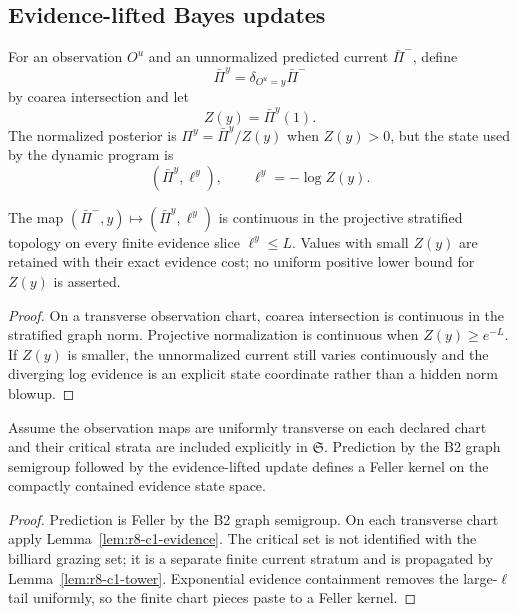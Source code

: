 \subsection{Evidence-lifted Bayes updates}

For an observation $O^u$ and an unnormalized predicted current $\bar\Pi^-$,
define
\[
 \bar\Pi^y=\delta_{O^u=y}\bar\Pi^-
\]
by coarea intersection and let
\[
 Z(y)=\bar\Pi^y(1).
\]
The normalized posterior is $\Pi^y=\bar\Pi^y/Z(y)$ when $Z(y)>0$, but the state
used by the dynamic program is
\[
 (\bar\Pi^y,\ell^y),\qquad \ell^y=-\log Z(y).
\]

\begin{lemma}
\label{lem:r8-c1-evidence}
The map $(\bar\Pi^-,y)\mapsto(\bar\Pi^y,\ell^y)$ is continuous in the projective
stratified topology on every finite evidence slice $\ell^y\le L$.  Values with
small $Z(y)$ are retained with their exact evidence cost; no uniform positive
lower bound for $Z(y)$ is asserted.
\end{lemma}

\begin{proof}
On a transverse observation chart, coarea intersection is continuous in the
stratified graph norm.  Projective normalization is continuous when
$Z(y)\ge e^{-L}$.  If $Z(y)$ is smaller, the unnormalized current still varies
continuously and the diverging log evidence is an explicit state coordinate
rather than a hidden norm blowup.
\end{proof}

\begin{theorem}
\label{thm:r8-c1-feller}
Assume the observation maps are uniformly transverse on each declared chart
and their critical strata are included explicitly in $\mathfrak S$.  Prediction
by the B2 graph semigroup followed by the evidence-lifted update defines a
Feller kernel on the compactly contained evidence state space.
\end{theorem}

\begin{proof}
Prediction is Feller by the B2 graph semigroup.  On each transverse chart apply
Lemma~\ref{lem:r8-c1-evidence}.  The critical set is not identified with the
billiard grazing set; it is a separate finite current stratum and is propagated
by Lemma~\ref{lem:r8-c1-tower}.  Exponential evidence containment removes the
large-$\ell$ tail uniformly, so the finite chart pieces paste to a Feller
kernel.
\end{proof}

